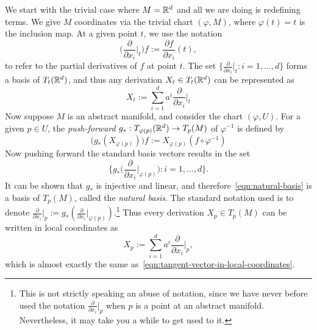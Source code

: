 \documentclass{article}
\begin{document}
	We start with the trivial case where $M = \mathbb{R}^d$ and all we are doing is redefining terms. We give $M$ coordinates via the trivial chart $(\varphi,M)$, where $\varphi(t) = t$ is the inclusion map. At a given point $t$, we use the notation
	\begin{equation*}
		\bigg(\frac{\partial}{\partial x_i}\Big|_{t}\bigg)f := \frac{\partial f}{\partial x_i}(t),
	\end{equation*}
	to refer to the partial derivatives of $f$ at point $t$. The set $\{\frac{\partial}{\partial x_i}|_{t}:i = 1,\ldots,d\}$ forms a basis of $T_t(\mathbb{R}^d)$, and thus any derivation $X_t \in T_t(\mathbb{R}^d)$ can be represented as 
	\begin{equation}
	\label{eqn:tangent-vector-in-local-coordinates}
		X_t := \sum_{i = 1}^{d} a^i \frac{\partial}{\partial x_i}\Big|_{t}
	\end{equation}
	Now suppose $M$ is an abstract manifold, and consider the chart $(\varphi,U)$. For a given $p \in U$, the \emph{push-forward} $g_{\ast}: T_{\varphi(p)}(\mathbb{R}^d) \to T_{p}(M)$ of $\varphi^{-1}$ is defined by 
	\begin{equation}
	\label{eqn:push-forward}
		\bigg(g_{\ast}(X_{\varphi(p)})\bigg)f := X_{\varphi(p)}(f \circ \varphi^{-1})
	\end{equation}
	Now pushing forward the standard basis vectors results in the set
	\begin{equation}
	\label{eqn:natural-basis}
		\bigg\{g_{\ast}\Big(\frac{\partial}{\partial x_i}\Big|_{\varphi(p)}\Big): i = 1,\ldots, d\bigg\}.
	\end{equation}
	It can be shown that $g_{\ast}$ is injective and linear, and therefore~\eqref{eqn:natural-basis} is a basis of $T_p(M)$, called the \emph{natural basis}. The standard notation used is to denote $\frac{\partial}{\partial x_i}|_{p} := g_{\ast}(\frac{\partial}{\partial x_i}|_{\varphi(p)})$.\footnote{This is not strictly speaking an abuse of notation, since we have never before used the notation $\frac{\partial}{\partial x_i}|_{p}$ when $p$ is a point at an abstract manifold. Nevertheless, it may take you a while to get used to it.} Thus every derivation $X_p \in T_p(M)$ can be written in local coordinates as 
	\begin{equation}
	\label{eqn:derivation-in-local-coordinates}
	X_p := \sum_{i = 1}^{d} a^i \frac{\partial}{\partial x_i}\Big|_{p},
	\end{equation}
	which is almost exactly the same as~\eqref{eqn:tangent-vector-in-local-coordinates}. 
	
\end{document}
